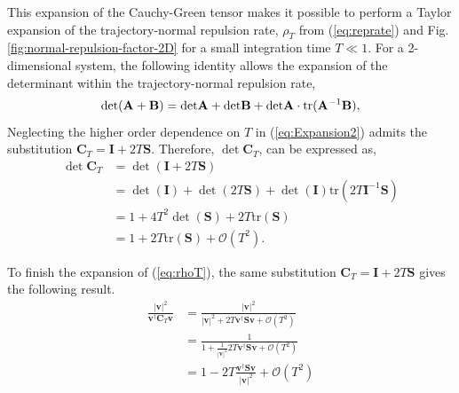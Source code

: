 \documentclass[twocolumn]{svjour3}
\newcommand{\edit}[3]{{\color{red} #2}}
\begin{document}
This expansion of the Cauchy-Green tensor \edit{admits the small time expansion for the trajectory-normal repulsion rate from (\ref{eq:reprate}) and Fig. \ref{fig:normal-repulsion-factor-2D}.}{makes it possible to perform a Taylor expansion of the trajectory-normal repulsion rate, $\rho_T$ from (\ref{eq:reprate}) and Fig. \ref{fig:normal-repulsion-factor-2D} for a small integration time $T\ll1$}{10}. For a 2-dimensional system, the following identity allows the expansion of the determinant within the trajectory-normal repulsion rate,
\begin{equation}
{\rm det} (\mathbf{A} + \mathbf{B}) = {\rm det} \mathbf{A} + {\rm det} \mathbf{B} + {\rm det} \mathbf{A} \cdot {\rm tr}(\mathbf{A}^{-1} \mathbf{B}), 
\end{equation}
Neglecting the higher order dependence on $T$ in (\ref{eq:Expansion2}) admits the substitution \(\mathbf{C}_T   = \mathbf{I} +2T\mathbf{S} \). Therefore, \(\det \mathbf{C}_T \), can be expressed as,
\begin{equation}\label{eq:detC}
\begin{aligned}
\det \mathbf{C}_T &= \det(\mathbf{I} +2T\mathbf{S}) \\
&= \det(\mathbf{I} ) + \det(2T\mathbf{S}) + \det(\mathbf{I}) \text{tr} (2T\mathbf{I} ^{-1}\mathbf{S}) \\
&= 1 + 4T^2\det(\mathbf{S}) + 2T\text{tr}(\mathbf{S}) \\
&= 1 + 2T\text{tr}(\mathbf{S}) + \mathcal{O}(T^2).
\end{aligned}
\end{equation}

To finish the expansion of  (\ref{eq:rhoT}), the same substitution \(\mathbf{C}_T   = \mathbf{I} +2T\mathbf{S} \) gives the following result.
\begin{equation}\label{eq:expand}
\begin{aligned}
\frac{\left|\mathbf{v}\right|^2}{\mathbf{v}^\dagger \mathbf{C}_T\mathbf{v}} &= \frac{\left|\mathbf{v}\right|^2}{\left|\mathbf{v}\right|^2+2T \mathbf{v}^\dagger\mathbf{S}\mathbf{v}+\mathcal{O}(T^2)} \\
&= \frac{1}{1+\frac{1}{\left|\mathbf{v}\right|^2}2T\mathbf{v}^\dagger\mathbf{S}\mathbf{v}+\mathcal{O}(T^2)} \\
&= 1-2T \frac{\mathbf{v}^\dagger \mathbf{S}\mathbf{v}}{\left|\mathbf{v}\right|^2} + \mathcal{O}(T^2)
\end{aligned}
\end{equation}
\end{document}
